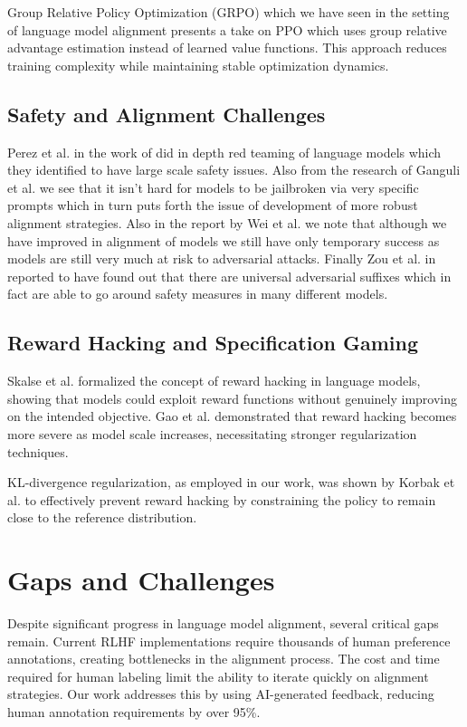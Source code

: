\documentclass[conference]{IEEEtran}
\begin{document}
Group Relative Policy Optimization (GRPO) which we have seen in the setting of language model alignment presents a take on PPO which uses group relative advantage estimation instead of learned value functions. This approach reduces training complexity while maintaining stable optimization dynamics.

\subsection{Safety and Alignment Challenges}

Perez et al. in the work of \cite{perez2022red} did in depth red teaming of language models which they identified to have large scale safety issues. Also from the research of Ganguli et al. \cite{ganguli2022red} we see that it isn’t hard for models to be jailbroken via very specific prompts which in turn puts forth the issue of development of more robust alignment strategies. Also in the report by Wei et al. \cite{wei2023jailbroken} we note that although we have improved in alignment of models we still have only temporary success as models are still very much at risk to adversarial attacks. Finally Zou et al. in \cite{zou2023universal} reported to have found out that there are universal adversarial suffixes which in fact are able to go around safety measures in many different models.

\subsection{Reward Hacking and Specification Gaming}

Skalse et al. \cite{skalse2022defining} formalized the concept of reward hacking in language models, showing that models could exploit reward functions without genuinely improving on the intended objective. Gao et al. \cite{gao2023scaling} demonstrated that reward hacking becomes more severe as model scale increases, necessitating stronger regularization techniques.

KL-divergence regularization, as employed in our work, was shown by Korbak et al. \cite{korbak2022rl} to effectively prevent reward hacking by constraining the policy to remain close to the reference distribution.


\section{Gaps and Challenges}

Despite significant progress in language model alignment, several critical gaps remain. Current RLHF implementations require thousands of human preference annotations, creating bottlenecks in the alignment process. The cost and time required for human labeling limit the ability to iterate quickly on alignment strategies. Our work addresses this by using AI-generated feedback, reducing human annotation requirements by over 95\%.
\end{document}
